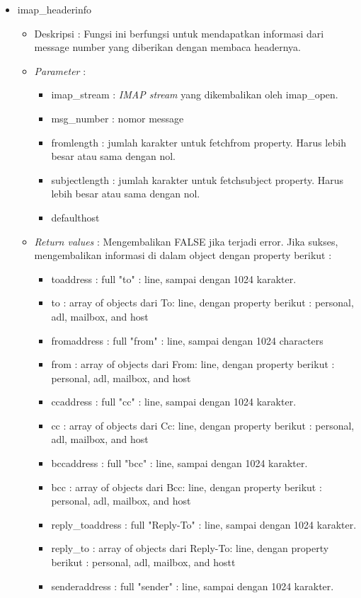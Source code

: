 \begin{itemize}
\item imap\_headerinfo
\begin{itemize}
\item Deskripsi : Fungsi ini berfungsi untuk mendapatkan informasi dari message number yang diberikan dengan membaca headernya.
\item \textit{Parameter} :
\begin{itemize}
\item imap\_stream : \textit{IMAP stream} yang dikembalikan oleh imap\_open.
\item msg\_number : nomor message
\item fromlength : jumlah karakter untuk fetchfrom property. Harus lebih besar atau sama dengan nol.
\item subjectlength : jumlah karakter untuk fetchsubject property. Harus lebih besar atau sama dengan nol.
\item defaulthost
\end{itemize}
\item \textit{Return values} : Mengembalikan FALSE jika terjadi error. Jika sukses, mengembalikan informasi di dalam object dengan property berikut :
 \begin{itemize}
 \item toaddress : full "to" : line, sampai dengan 1024 karakter.
 \item to : array of objects dari To: line, dengan property berikut : personal, adl, mailbox, and host
 \item fromaddress : full "from" : line, sampai dengan 1024 characters
 \item from : array of objects dari From: line, dengan property berikut : personal, adl, mailbox, and host
 \item ccaddress : full "cc" : line, sampai dengan 1024 karakter.
 \item cc : array of objects dari Cc: line, dengan property berikut : personal, adl, mailbox, and host
 \item bccaddress : full "bcc" : line, sampai dengan 1024 karakter.
 \item bcc : array of objects dari Bcc: line, dengan property berikut : personal, adl, mailbox, and host
 \item reply\_toaddress : full "Reply-To" : line, sampai dengan 1024 karakter.
 \item reply\_to : array of objects dari Reply-To: line, dengan property berikut : personal, adl, mailbox, and hostt
 \item senderaddress : full "sender" : line, sampai dengan 1024 karakter.

\end{itemize}
\end{itemize}
\end{itemize}
